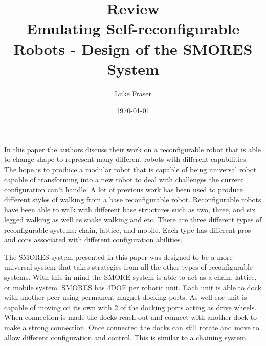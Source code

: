 \documentclass{article}
\begin{document}
\title{{\large Review} \\ Emulating Self-reconfigurable Robots - Design of the SMORES System}
\author{Luke Fraser}
\date{\today}
\maketitle

\begingroup
\renewcommand{\section}[2]{}


\endgroup

\section*{Summary}
In this paper the authors discuss their work on a reconfigurable robot that is able to change shape to represent many different robots with different capabilities. The hope is to produce a modular robot that is capable of being universal robot capable of transforming into a new robot to deal with challenges the current configuration can't handle. A lot of previous work has been used to produce different styles of walking from a base reconfigurable robot. Reconfigurable robots have been able to walk with different base structures such as two, three, and six legged walking as well as snake walking and etc. There are three different types of reconfigurable systems: chain, lattice, and mobile. Each type has different pros and cons associated with different configuration abilities.

The SMORES system presented in this paper was designed to be a more universal system that takes strategies from all the other types of reconfigurable systems. With this in mind the SMORE system is able to act as a chain, lattice, or mobile system. SMORES has 4DOF per robotic unit. Each unit is able to dock with another peer using permanent magnet docking ports. As well eac unit is capable of moving on its own with 2 of the docking ports acting as drive wheels. When connection is made the docks reach out and connect with another dock to make a strong connection. Once connected the docks can still rotate and move to allow different configuration and control. This is similar to a chaining system.
\end{document}
